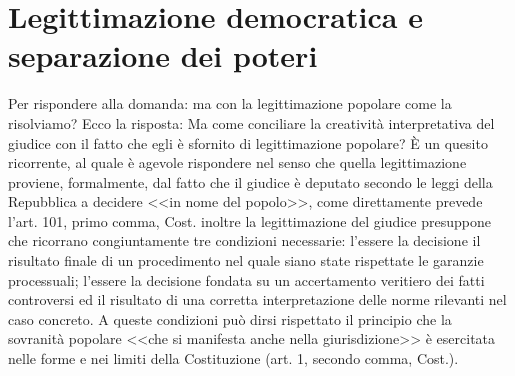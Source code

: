\section{Legittimazione democratica e separazione dei poteri}
Per rispondere alla domanda: ma con la legittimazione popolare come la risolviamo? Ecco la risposta:
Ma come conciliare la creatività interpretativa del giudice con il fatto che egli
è sfornito di legittimazione popolare? È un quesito ricorrente, al quale è agevole
rispondere nel senso che quella legittimazione proviene, formalmente, dal fatto che il
giudice è deputato secondo le leggi della Repubblica a decidere <<in nome del popolo>>,
come direttamente prevede l'art. 101, primo comma, Cost. inoltre la legittimazione del giudice presuppone che ricorrano congiuntamente tre condizioni necessarie: l'essere la decisione il risultato finale di un procedimento nel quale siano state rispettate le garanzie processuali; l'essere
la decisione fondata su un accertamento veritiero dei fatti controversi ed il risultato
di una corretta interpretazione delle norme rilevanti nel caso concreto. A queste
condizioni può dirsi rispettato il principio che la sovranità popolare <<che si manifesta
anche nella giurisdizione>> è esercitata nelle forme e nei limiti della Costituzione (art.
1, secondo comma, Cost.).

